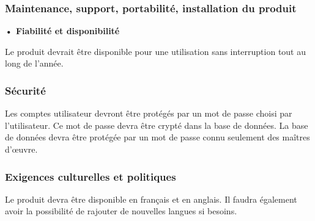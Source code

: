 \subsubsection{Maintenance, support, portabilité, installation du produit}

\textbf{• Fiabilité et disponibilité}

Le produit devrait être disponible pour une utilisation sans interruption tout au long de l’année.  

\subsubsection{Sécurité}

Les comptes utilisateur devront être protégés par un mot de passe choisi par l’utilisateur. Ce mot de passe devra être crypté dans la base de données.
La base de données devra être protégée par un mot de passe connu seulement des maîtres d’œuvre.

\subsubsection{Exigences culturelles et politiques}

Le produit devra être disponible en français et en anglais. Il faudra également avoir la possibilité de rajouter de nouvelles langues si besoins.